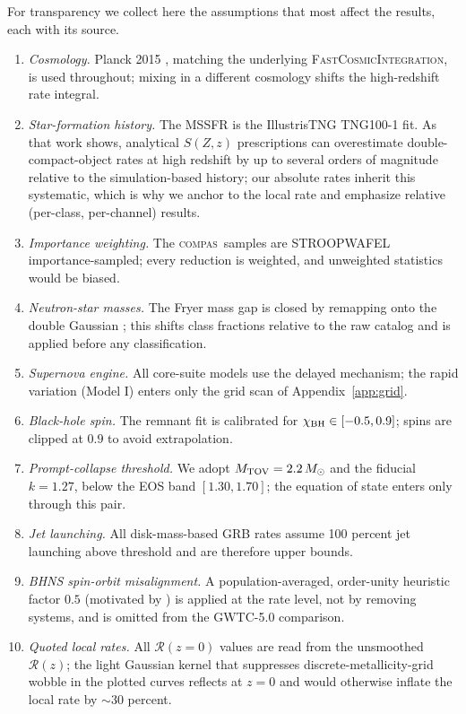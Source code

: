 \documentclass[twocolumn,amsmath]{aastex702}
\newcommand{\Msun}{M_\odot}
\newcommand{\Mtov}{M_{\rm TOV}}
\newcommand{\compas}{\textsc{compas}}
\newcommand{\fci}{\textsc{FastCosmicIntegration}}
\newcommand{\Rz}{\mathcal{R}(z)}
\newcommand{\Rzero}{\mathcal{R}(z{=}0)}
\begin{document}
For transparency we collect here the assumptions that most affect the results,
each with its source.
\begin{enumerate}
\item \textit{Cosmology.} Planck 2015 \citep{planck2016}, matching the underlying
\fci, is used throughout; mixing in a different cosmology shifts the high-redshift
rate integral.
\item \textit{Star-formation history.} The MSSFR is the \citet{levina2026}
IllustrisTNG TNG100-1 fit. As that work shows, analytical $S(Z,z)$ prescriptions
can overestimate double-compact-object rates at high redshift by up to several
orders of magnitude relative to the simulation-based history; our absolute rates
inherit this systematic, which is why we anchor to the local rate and emphasize
relative (per-class, per-channel) results.
\item \textit{Importance weighting.} The \compas\ samples are STROOPWAFEL
importance-sampled; every reduction is weighted, and unweighted statistics would
be biased.
\item \textit{Neutron-star masses.} The Fryer mass gap is closed by remapping onto
the \citet{alsing2018} double Gaussian \citep{mandel2020}; this shifts class
fractions relative to the raw catalog and is applied before any classification.
\item \textit{Supernova engine.} All core-suite models use the \citet{fryer2012}
delayed mechanism; the rapid variation (Model I) enters only the grid scan of
Appendix~\ref{app:grid}.
\item \textit{Black-hole spin.} The \citet{foucart2018} remnant fit is calibrated
for $\chi_{\rm BH} \in [-0.5, 0.9]$; spins are clipped at $0.9$ to avoid
extrapolation.
\item \textit{Prompt-collapse threshold.} We adopt $\Mtov = 2.2\,\Msun$
\citep{raaijmakers2021} and the \citet{gottlieb2023} fiducial $k = 1.27$, below the
\citet{bauswein2013} EOS band $[1.30, 1.70]$; the equation of state enters only
through this pair.
\item \textit{Jet launching.} All disk-mass-based GRB rates assume 100 percent jet
launching above threshold \citep{gottlieb2023} and are therefore upper bounds.
\item \textit{BHNS spin-orbit misalignment.} A population-averaged, order-unity
heuristic factor $0.5$ (motivated by \citealt{fragos2010,kawaguchi2015}) is
applied at the rate level, not by removing systems, and is omitted from the
GWTC-5.0 comparison.
\item \textit{Quoted local rates.} All $\Rzero$ values are read from the
unsmoothed $\Rz$; the light Gaussian kernel that suppresses
discrete-metallicity-grid wobble in the plotted curves reflects at $z = 0$ and
would otherwise inflate the local rate by $\sim 30$ percent.
\end{enumerate}
\end{document}

